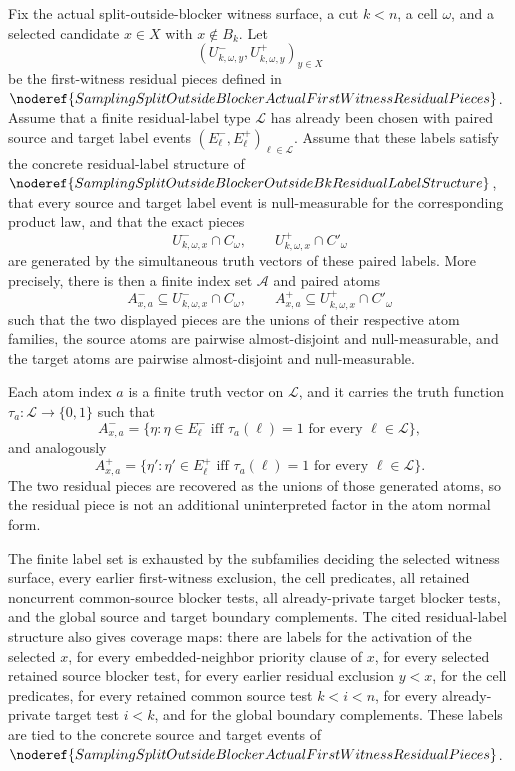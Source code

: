 \begin{helper}
Fix the actual split-outside-blocker witness surface, a cut \(k<n\), a cell
\(\omega\), and a selected candidate \(x\in X\) with \(x\notin B_k\).
Let
\[
  (U^-_{k,\omega,y},U^+_{k,\omega,y})_{y\in X}
\]
be the first-witness residual pieces defined in
\(\noderef{SamplingSplitOutsideBlockerActualFirstWitnessResidualPieces}\).
Assume that a finite residual-label type \(\mathcal L\) has already been
chosen with paired source and target label events
\((E^-_\ell,E^+_\ell)_{\ell\in\mathcal L}\).  Assume that these labels
satisfy the concrete residual-label structure of
\(\noderef{SamplingSplitOutsideBlockerOutsideBkResidualLabelStructure}\),
that every source and target label event is null-measurable for the
corresponding product law, and that the exact pieces
\[
  U^-_{k,\omega,x}\cap C_\omega,
  \qquad
  U^+_{k,\omega,x}\cap C'_\omega
\]
are generated by the simultaneous truth vectors of these paired labels.
More precisely, there is then a finite index set \(\mathcal A\) and paired atoms
\[
  A^-_{x,a}\subseteq U^-_{k,\omega,x}\cap C_\omega,\qquad
  A^+_{x,a}\subseteq U^+_{k,\omega,x}\cap C'_\omega
\]
such that the two displayed pieces are the unions of their respective atom
families, the source atoms are pairwise almost-disjoint and null-measurable,
and the target atoms are pairwise almost-disjoint and null-measurable.

Each atom index \(a\) is a finite truth vector on \(\mathcal L\), and it
carries the truth function \(\tau_a:\mathcal L\to\{0,1\}\) such that
\[
  A^-_{x,a}
  =
  \{\eta:\eta\in E^-_\ell \text{ iff } \tau_a(\ell)=1
        \text{ for every }\ell\in\mathcal L\},
\]
and analogously
\[
  A^+_{x,a}
  =
  \{\eta':\eta'\in E^+_\ell \text{ iff } \tau_a(\ell)=1
        \text{ for every }\ell\in\mathcal L\}.
\]
The two residual pieces are recovered as the unions of those generated atoms,
so the residual piece is not an additional uninterpreted factor in the atom
normal form.

The finite label set is exhausted by the subfamilies deciding the selected
witness surface, every earlier first-witness exclusion, the cell predicates,
all retained noncurrent common-source blocker tests, all already-private
target blocker tests, and the global source and target boundary
complements.  The cited residual-label structure also gives coverage maps:
there are labels for the activation of the selected \(x\), for every
embedded-neighbor priority clause of \(x\), for every selected retained
source blocker test, for every earlier residual exclusion \(y<x\), for the
cell predicates, for every retained common source test \(k<i<n\), for every
already-private target test \(i<k\), and for the global boundary complements.
These labels are tied to the concrete source and target events of
\(\noderef{SamplingSplitOutsideBlockerActualFirstWitnessResidualPieces}\).
\end{helper}
